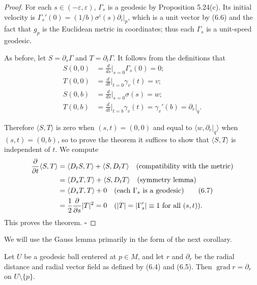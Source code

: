\begin{proof}
For each $s \in (-\varepsilon, \varepsilon)$, $\Gamma_s$ is a geodesic by Proposition 5.24(c). Its initial velocity is $\Gamma_s'(0) = (1/b)\sigma^i(s)\partial_i|_p$, which is a unit vector by (6.6) and the fact that $g_p$ is the Euclidean metric in coordinates; thus each $\Gamma_s$ is a unit-speed geodesic.

As before, let $S = \partial_s \Gamma$ and $T = \partial_t \Gamma$. It follows from the definitions that
\begin{align*}
S(0,0) &= \frac{d}{ds}\Big|_{s=0} \Gamma_s(0) = 0; \\
T(0,0) &= \frac{d}{dt}\Big|_{t=0} \gamma_v(t) = v; \\
S(0,b) &= \frac{d}{ds}\Big|_{s=0} \sigma(s) = w; \\
T(0,b) &= \frac{d}{dt}\Big|_{t=b} \gamma_v(t) = \gamma_v'(b) = \partial_r|_q.
\end{align*}

Therefore $\langle S,T\rangle$ is zero when $(s,t) = (0,0)$ and equal to $\langle w, \partial_r|_q \rangle$ when $(s,t) = (0,b)$, so to prove the theorem it suffices to show that $\langle S,T\rangle$ is independent of $t$. We compute
\begin{align}
\frac{\partial}{\partial t}\langle S,T\rangle &= \langle D_t S, T\rangle + \langle S, D_t T\rangle \quad \text{(compatibility with the metric)} \notag\\
&= \langle D_s T, T\rangle + \langle S, D_t T\rangle \quad \text{(symmetry lemma)} \notag\\
&= \langle D_s T, T\rangle + 0 \quad \text{(each $\Gamma_s$ is a geodesic)} \tag{6.7} \\
&= \frac{1}{2}\frac{\partial}{\partial s}|T|^2 = 0 \quad (|T| = |\Gamma_s'| \equiv 1 \text{ for all } (s,t)). \notag
\end{align}
This proves the theorem. $\square$
\end{proof}

We will use the Gauss lemma primarily in the form of the next corollary.


\begin{corollary}
\label{cor:gradient-radial-distance}

Let $U$ be a geodesic ball centered at $p \in M$, and let $r$ and $\partial_r$ be the radial distance and radial vector field as defined by (6.4) and (6.5). Then $\operatorname{grad} r = \partial_r$ on $U \setminus \{p\}$.
\end{corollary}

